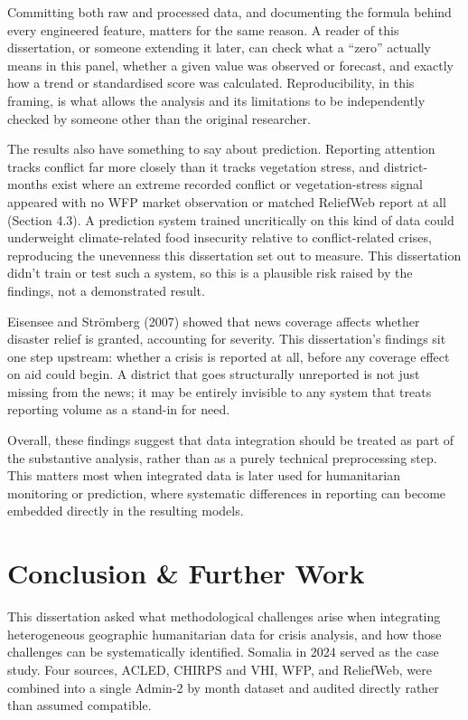 \documentclass[12pt,a4paper]{article}
\begin{document}
Committing both raw and processed data, and documenting the formula behind every engineered feature, matters for the same reason. A reader of this dissertation, or someone extending it later, can check what a ``zero'' actually means in this panel, whether a given value was observed or forecast, and exactly how a trend or standardised score was calculated. Reproducibility, in this framing, is what allows the analysis and its limitations to be independently checked by someone other than the original researcher.

The results also have something to say about prediction. Reporting attention tracks conflict far more closely than it tracks vegetation stress, and district-months exist where an extreme recorded conflict or vegetation-stress signal appeared with no WFP market observation or matched ReliefWeb report at all (Section 4.3). A prediction system trained uncritically on this kind of data could underweight climate-related food insecurity relative to conflict-related crises, reproducing the unevenness this dissertation set out to measure. This dissertation didn't train or test such a system, so this is a plausible risk raised by the findings, not a demonstrated result.

Eisensee and Str\"omberg (2007) showed that news coverage affects whether disaster relief is granted, accounting for severity. This dissertation's findings sit one step upstream: whether a crisis is reported at all, before any coverage effect on aid could begin. A district that goes structurally unreported is not just missing from the news; it may be entirely invisible to any system that treats reporting volume as a stand-in for need.

Overall, these findings suggest that data integration should be treated as part of the substantive analysis, rather than as a purely technical preprocessing step. This matters most when integrated data is later used for humanitarian monitoring or prediction, where systematic differences in reporting can become embedded directly in the resulting models.

\clearpage
\section{Conclusion \& Further Work}

This dissertation asked what methodological challenges arise when integrating heterogeneous geographic humanitarian data for crisis analysis, and how those challenges can be systematically identified. Somalia in 2024 served as the case study. Four sources, ACLED, CHIRPS and VHI, WFP, and ReliefWeb, were combined into a single Admin-2 by month dataset and audited directly rather than assumed compatible.
\end{document}
